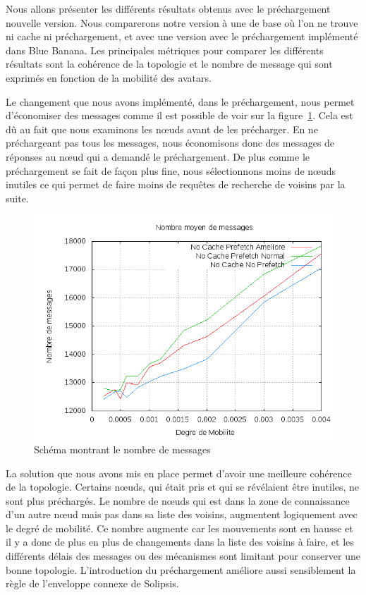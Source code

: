 Nous allons présenter les différents résultats obtenus avec le préchargement nouvelle version. Nous comparerons notre version à une de base où l'on ne trouve ni cache ni préchargement, et avec une version avec le préchargement implémenté dans Blue Banana. Les principales métriques pour comparer les différents résultats sont la cohérence de la topologie et le nombre de message qui sont exprimés en fonction de la mobilité des avatars.

\par Le changement que nous avons implémenté, dans le préchargement, nous permet d'économiser des messages comme il est possible de voir sur la figure~\ref{courbeNbMessPrefetch}. Cela est dû au fait que nous examinons les nœuds avant de les précharger. En ne préchargeant pas tous les messages, nous économisons donc des messages de réponses au nœud qui a demandé le préchargement. De plus comme le préchargement se fait de façon plus fine, nous sélectionnons moins de nœuds inutiles ce qui permet de faire moins de requêtes de recherche de voisins par la suite.
	\begin{figure}[!h]
        \centering
        \includegraphics[scale=0.5]{../CacheCode/SolipsisPeersim/resultats/Courbes/Courbes_Final_Rapport/Nombre_Messages_Prefetchs.png}
        \caption{Schéma montrant le nombre de messages}
        \label{courbeNbMessPrefetch}
        \end{figure}

\par La solution que nous avons mis en place permet d'avoir une meilleure cohérence de la topologie. Certains nœuds, qui était pris et qui se révélaient être inutiles, ne sont plus préchargés. Le nombre de nœuds qui est dans la zone de connaissance d'un autre nœud mais pas dans sa liste des voisins, augmentent logiquement avec le degré de mobilité. Ce nombre augmente car les mouvements sont en hausse et il y a donc de plus en plus de changements dans la liste des voisins à faire, et les différents délais des messages ou des mécanismes sont limitant pour conserver une bonne topologie. L'introduction du préchargement améliore aussi sensiblement la règle de l'enveloppe connexe de Solipsis.

